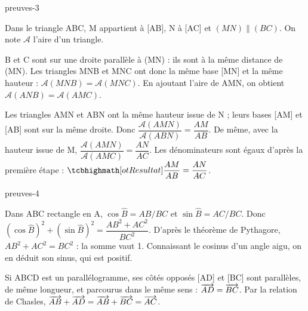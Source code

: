 \begin{blocEdition}{preuves-3}

Dans le triangle ABC, M appartient à [AB], N à [AC] et $(MN)\parallel(BC)$.
On note $\mathcal A$ l’aire d’un triangle.
\begin{center}\end{center}
\begin{demonstration}
B et C sont sur une droite parallèle à (MN) : ils sont à la même distance
de (MN). Les triangles MNB et MNC ont donc la même base [MN] et la même
hauteur : $\mathcal A(MNB)=\mathcal A(MNC)$. En ajoutant l’aire de AMN,
on obtient $\mathcal A(ANB)=\mathcal A(AMC)$.
\end{demonstration}
\begin{demonstration}
Les triangles AMN et ABN ont la même hauteur issue de N ; leurs bases
[AM] et [AB] sont sur la même droite. Donc
$\dfrac{\mathcal A(AMN)}{\mathcal A(ABN)}=\dfrac{AM}{AB}$. De même, avec la
hauteur issue de M, $\dfrac{\mathcal A(AMN)}{\mathcal A(AMC)}=\dfrac{AN}{AC}$.
Les dénominateurs sont égaux d’après la première étape :
$\res{\dfrac{AM}{AB}=\dfrac{AN}{AC}}$.
\end{demonstration}

\end{blocEdition}
\begin{blocEdition}{preuves-4}

\begin{demonstration}[$(\cos\widehat B)^2+(\sin\widehat B)^2=1$]
Dans ABC rectangle en A, $\cos\widehat B=AB/BC$ et $\sin\widehat B=AC/BC$. Donc
$(\cos\widehat B)^2+(\sin\widehat B)^2=\dfrac{AB^2+AC^2}{BC^2}$. D’après le théorème
de Pythagore, $AB^2+AC^2=BC^2$ : la somme vaut 1. Connaissant le cosinus
d’un angle aigu, on en déduit son sinus, qui est positif.
\end{demonstration}
\begin{demonstration}
Si ABCD est un parallélogramme, ses côtés opposés [AD] et [BC] sont
parallèles, de même longueur, et parcourus dans le même sens :
$\overrightarrow{AD}=\overrightarrow{BC}$. Par la relation de Chasles,
$\overrightarrow{AB}+\overrightarrow{AD}=\overrightarrow{AB}+\overrightarrow{BC}=\overrightarrow{AC}$.
\end{demonstration}

\end{blocEdition}
